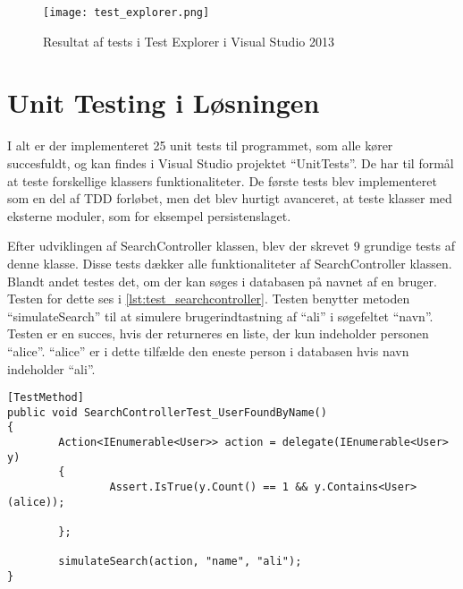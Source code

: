 \begin{figure}
  \centering
  \texttt{[image: test\_explorer.png]}
  \caption{Resultat af tests i Test Explorer i Visual Studio 2013}
  \label{fig:test_explorer}
\end{figure}

\section{Unit Testing i Løsningen}


I alt er der implementeret 25 unit tests til programmet, som alle kører succesfuldt, og kan findes i Visual Studio projektet \enquote{UnitTests}. De har til formål at teste forskellige klassers funktionaliteter. De første tests blev implementeret som en del af TDD forløbet, men det blev hurtigt avanceret, at teste klasser med eksterne moduler, som for eksempel persistenslaget. 

Efter udviklingen af SearchController klassen, blev der skrevet 9 grundige tests af denne klasse. Disse tests dækker alle funktionaliteter af SearchController klassen. Blandt andet testes det, om der kan søges i databasen på navnet af en bruger. Testen for dette ses i \cref{lst:test_searchcontroller}. Testen benytter metoden \enquote{simulateSearch} til at simulere brugerindtastning af \enquote{ali} i søgefeltet \enquote{navn}. Testen er en succes, hvis der returneres en liste, der kun indeholder personen \enquote{alice}. \enquote{alice} er i dette tilfælde den eneste person i databasen hvis navn indeholder \enquote{ali}.

\begin{lstlisting}[label=lst:test_searchcontroller, caption={Eksempel på testfunktion}]
[TestMethod]
public void SearchControllerTest_UserFoundByName()
{
        Action<IEnumerable<User>> action = delegate(IEnumerable<User> y)
        {
                Assert.IsTrue(y.Count() == 1 && y.Contains<User>(alice));

        };

        simulateSearch(action, "name", "ali");
}
\end{lstlisting}
